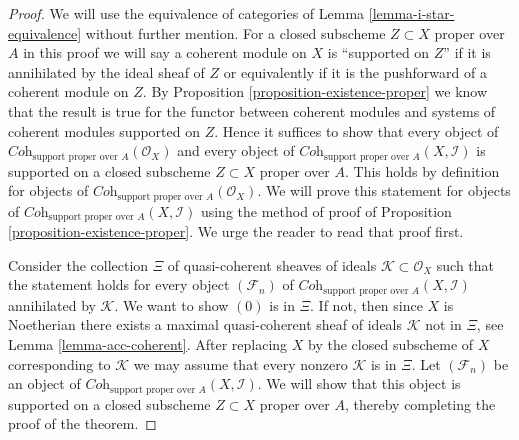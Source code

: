 \documentclass{stacks-project}
\theoremstyle{plain}
\theoremstyle{definition}
\theoremstyle{remark}
\numberwithin{equation}{subsection}
\begin{document}
\begin{proof}
We will use the equivalence of categories of
Lemma \ref{lemma-i-star-equivalence}
without further mention.
For a closed subscheme $Z \subset X$ proper over $A$
in this proof we will say a coherent module on $X$ is
``supported on $Z$'' if it is annihilated by the ideal
sheaf of $Z$ or equivalently if it is the pushforward
of a coherent module on $Z$.
By Proposition \ref{proposition-existence-proper} we know
that the result is true for
the functor between coherent modules and systems of coherent
modules supported on $Z$. Hence it suffices to show that
every object of
$\textit{Coh}_{\text{support proper over }A}(\mathcal{O}_X)$
and every object of
$\textit{Coh}_{\text{support proper over }A}(X, \mathcal{I})$ is
supported on a closed subscheme $Z \subset X$ proper over $A$.
This holds by definition for objects of
$\textit{Coh}_{\text{support proper over }A}(\mathcal{O}_X)$.
We will prove this statement for objects of
$\textit{Coh}_{\text{support proper over }A}(X, \mathcal{I})$
using the method of proof of Proposition \ref{proposition-existence-proper}.
We urge the reader to read that proof first.

\medskip\noindent
Consider the collection $\Xi$ of quasi-coherent sheaves of ideals
$\mathcal{K} \subset \mathcal{O}_X$ such that the statement holds
for every object $(\mathcal{F}_n)$ of
$\textit{Coh}_{\text{support proper over }A}(X, \mathcal{I})$
annihilated by $\mathcal{K}$. We want to show $(0)$ is in $\Xi$.
If not, then since $X$ is Noetherian there exists a maximal
quasi-coherent sheaf of ideals $\mathcal{K}$ not in $\Xi$, see
Lemma \ref{lemma-acc-coherent}.
After replacing $X$ by the closed subscheme of $X$
corresponding to $\mathcal{K}$ we may assume that every nonzero
$\mathcal{K}$ is in $\Xi$. Let $(\mathcal{F}_n)$ be an object of
$\textit{Coh}_{\text{support proper over }A}(X, \mathcal{I})$.
We will show that this object is supported on a closed subscheme
$Z \subset X$ proper over $A$, thereby completing the
proof of the theorem.


\end{proof}
\end{document}
